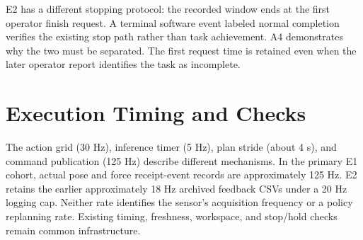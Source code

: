 E2 has a different stopping protocol: the recorded window ends at the first operator finish request. A terminal software event labeled normal completion verifies the existing stop path rather than task achievement. A4 demonstrates why the two must be separated. The first request time is retained even when the later operator report identifies the task as incomplete.

\section{Execution Timing and Checks}
The action grid (30 Hz), inference timer (5 Hz), plan stride (about 4 s), and command publication (125 Hz) describe different mechanisms. In the primary E1 cohort, actual pose and force receipt-event records are approximately 125 Hz. E2 retains the earlier approximately 18 Hz archived feedback CSVs under a 20 Hz logging cap. Neither rate identifies the sensor's acquisition frequency or a policy replanning rate. Existing timing, freshness, workspace, and stop/hold checks remain common infrastructure.
